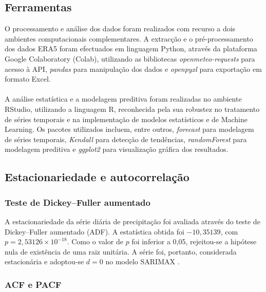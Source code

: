 \documentclass[9pt,twocolumn,twoside,english,portuguese]{opticajnl}
\begin{document}
\subsection{Ferramentas}
O processamento e análise dos dados foram realizados com recurso a dois ambientes computacionais complementares. A extracção e o pré-processamento dos dados ERA5 foram efectuados em linguagem Python, através da plataforma Google Colaboratory (Colab), utilizando as bibliotecas 
\textit{openmeteo-requests} para acesso à API, \textit{pandas} para manipulação dos dados e \textit{openpyxl} para exportação em formato Excel. \paragraph{}
A análise estatística e a modelagem preditiva foram realizadas no ambiente RStudio, utilizando a linguagem R, reconhecida pela sua robustez no tratamento de séries temporais e na implementação de modelos estatísticos e de Machine Learning. Os pacotes utilizados incluem, entre 
outros, \textit{forecast} para modelagem de séries temporais, \textit{Kendall} para detecção de tendências, \textit{randomForest} para modelagem preditiva e \textit{ggplot2} para visualização gráfica dos resultados.\paragraph{}
\subsection{Estacionariedade e autocorrelação}

\subsubsection{Teste de Dickey--Fuller aumentado}

A estacionariedade da série diária de precipitação foi avaliada através do
teste de Dickey--Fuller aumentado (ADF). A estatística obtida foi
$-10{,}35139$, com $p=2{,}53126\times10^{-18}$. Como o valor de $p$ foi
inferior a 0,05, rejeitou-se a hipótese nula de existência de uma raiz
unitária. A série foi, portanto, considerada estacionária e adoptou-se
$d=0$ no modelo SARIMAX \cite{dickey1979distribution}.

\subsubsection{ACF e PACF}
\end{document}
